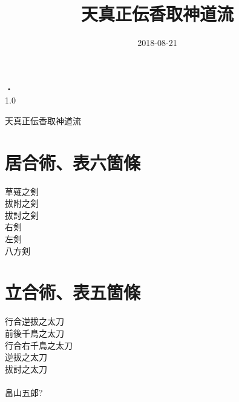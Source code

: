 \documentclass[dvipdfmx, a4paper, 12pt]{utarticle}
\begin{document}
\begin{CJK*}{UTF8}{min}
\CJKtilde
\begin{landscape}

\title{天真正伝香取神道流}
\author{}
\date{2018-08-21}
\maketitle
\thispagestyle{empty} %

\begin{center}
・\\
1.0
\end{center}

\newpage
\pagestyle{empty}
天真正伝香取神道流
\section{居合術、表六箇條}
\noindent 草薙之剣\\
拔附之剣\\
拔討之剣\\
右剣\\
左剣\\
八方剣\\
\section{立合術、表五箇條}
\noindent 行合逆拔之太刀\\
前後千鳥之太刀\\
行合右千鳥之太刀\\
逆拔之太刀\\
拔討之太刀\\
\\
畠山五郎?

\setcounter{section}{0}
\newpage
\pagestyle{empty}
\section{}
\noindent {}\\
\\
\\
\\
\\
\\

\end{landscape}
\end{CJK*}
\end{document}
